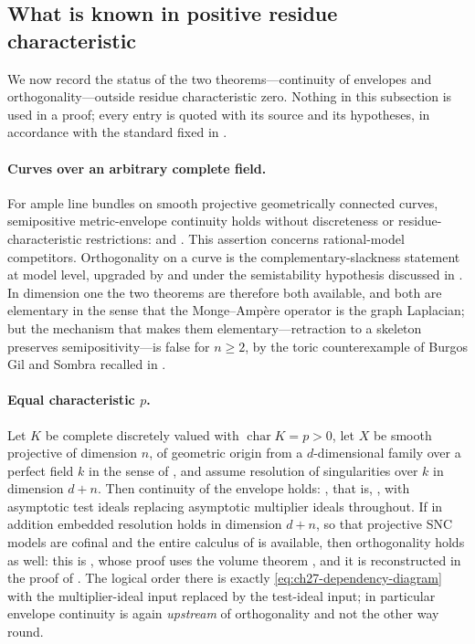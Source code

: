 \subsection{What is known in positive residue characteristic}
\label{sec:ch27-positive-characteristic}

We now record the status of the two theorems---continuity of envelopes and
orthogonality---outside residue characteristic zero.  Nothing in this
subsection is used in a proof; every entry is quoted with its source and its
hypotheses, in accordance with the standard fixed in
.

\paragraph{Curves over an arbitrary complete field.}
For ample line bundles on smooth projective geometrically connected
curves, semipositive metric-envelope continuity holds without discreteness
or residue-characteristic restrictions:
\cite[Theorem~1.1]{GJKM19} and .
This assertion concerns rational-model competitors.
Orthogonality on a curve is the complementary-slackness statement
 at model level, upgraded by
 and
 under the semistability
hypothesis discussed in .  In dimension one
the two theorems are therefore both available, and both are elementary in
the sense that the Monge--Amp\`ere operator is the graph Laplacian; but
the mechanism that makes them elementary---retraction to a skeleton
preserves semipositivity---is false for \(n\geq2\), by the toric
counterexample of Burgos Gil and Sombra recalled in
.

\paragraph{Equal characteristic \(p\).}
Let \(K\) be complete discretely valued with
\(\operatorname{char}K=p>0\), let \(X\) be smooth projective of dimension
\(n\), of geometric origin from a \(d\)-dimensional family over a perfect
field \(k\) in the sense of , and assume
resolution of singularities over \(k\) in dimension \(d+n\).  Then
continuity of the envelope holds:
, that is,
\cite[Theorem~8.2]{GJKM19}, with asymptotic test ideals replacing asymptotic
multiplier ideals throughout.  If in addition embedded resolution holds in
dimension \(d+n\), so that projective SNC models are cofinal and the entire
calculus of  is available,
then orthogonality holds as well: this is
\cite[Theorem~9.2]{GJKM19}, whose proof uses the volume theorem
\cite[Theorem~6.3.2]{BGGJKM20}, and it is reconstructed in the proof of
.  The logical order there is
exactly \eqref{eq:ch27-dependency-diagram} with the multiplier-ideal input
replaced by the test-ideal input; in particular envelope continuity is
again \emph{upstream} of orthogonality and not the other way round.

